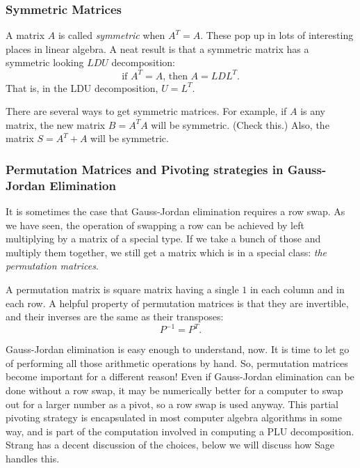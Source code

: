\documentclass[10pt,]{book}
\theoremstyle{plain}
\theoremstyle{definition}
\numberwithin{equation}{section}
\begin{document}
\subsubsection[Symmetric Matrices]{Symmetric Matrices}\label{subsubsection-30}

        A matrix \(A\) is called \emph{symmetric} when \(A^T = A\). These
        pop up in lots of interesting places in linear algebra. A neat result
        is that a symmetric matrix has a symmetric looking \(LDU\) decomposition:
        \[
        \text{if } A^T=A\text{, then } A = LDL^T .
        \]
        That is, in the LDU decomposition, \(U = L^T\).
\par

        There are several ways to get symmetric matrices. For example, if
        \(A\) is any matrix, the new matrix \(B = A^T A\) will be symmetric.
        (Check this.) Also, the matrix \(S = A^T + A\) will be symmetric.
\typeout{************************************************}
\typeout{************************************************}
\subsubsection[Permutation Matrices and Pivoting strategies in Gauss-Jordan Elimination]{Permutation Matrices and Pivoting strategies in Gauss-Jordan Elimination}\label{subsubsection-31}

        It is sometimes the case that Gauss-Jordan elimination requires a row
        swap. As we have seen, the operation of swapping a row can be achieved
        by left multiplying by a matrix of a special type. If we take a bunch of
        those and multiply them together, we still get a matrix which is in a
        special class: \emph{the permutation matrices}.
\par

        A permutation matrix is square matrix having a single \(1\) in each column
        and in each row. A helpful property of permutation matrices is that they
        are invertible, and their inverses are the same as their transposes:
        \[
        P^{-1} = P^T .
        \]
\par

        Gauss-Jordan elimination is easy enough to understand, now. It is time
        to let go of performing all those arithmetic operations by hand. So,
        permutation matrices become important for a different reason! Even if
        Gauss-Jordan elimination can be done without a row swap, it may be
        numerically better for a computer to swap out for a larger number as a
        pivot, so a row swap is used anyway. This partial pivoting strategy is
        encapsulated in most computer algebra algorithms in some way, and is
        part of the computation involved in computing a PLU decomposition.
        Strang has a decent discussion of the choices, below we will
        discuss how Sage handles this.
\typeout{************************************************}
\typeout{************************************************}
\end{document}
